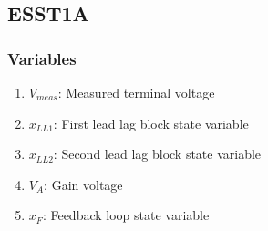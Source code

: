 \documentclass[12pt]{article}
\begin{document}
\subsection{ESST1A \cite{ESST1A}}

\subsubsection{Variables}
\begin{enumerate}
  \item $V_{meas}$: Measured terminal voltage
  \item $x_{LL1}$: First lead lag block state variable
  \item $x_{LL2}$: Second lead lag block state variable
  \item $V_A$: Gain voltage
  \item $x_F$: Feedback loop state variable
\end{enumerate}
\end{document}
